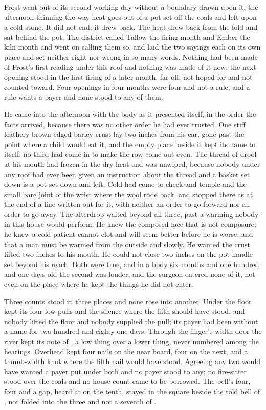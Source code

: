 Frost went out of its second working day without a boundary drawn upon it, the afternoon thinning the way heat goes out of a pot set off the coals and left upon a cold stone. It did not end; it drew back. The heat drew back from the fold and sat behind the pot. The district called Tallow the firing month and Ember the kiln month and went on calling them so, and  laid the two sayings each on its own place and set neither right nor wrong in so many words. Nothing had been made of Frost's first reading under this roof and nothing was made of it now; the next opening stood in the first firing of a later month, far off, not hoped for and not counted toward. Four openings in four months were four and not a rule, and a rule wants a payer and none stood to any of them.

He came into the afternoon with the body as it presented itself, in the order the facts arrived, because there was no other order he had ever trusted. One stiff leathery brown-edged barley crust lay two inches from his ear, gone past the point where a child would eat it, and the empty place beside it kept its name to itself; no third had come in to make the row come out even. The thread of drool at his mouth had frozen in the dry heat and was unwiped, because nobody under any roof had ever been given an instruction about the thread and a basket set down is a pot set down and left. Cold had come to cheek and temple and the small bare joint of the wrist where the wool rode back, and stopped there as at the end of a line written out for it, with neither an order to go forward nor an order to go away. The afterdrop waited beyond all three, past a warming nobody in this house would perform. He knew the composed face that is not composure; he knew a cold patient cannot clot and will seem better before he is worse, and that a man must be warmed from the outside and slowly. He wanted the crust lifted two inches to his mouth. He could not close two inches on the pot handle set beyond his reach. Both were true, and in a body six months and one hundred and one days old the second was louder, and the surgeon entered none of it, not even on the place where he kept the things he did not enter.

Three counts stood in three places and none rose into another. Under the floor  kept its four low pulls and the silence where the fifth should have stood, and nobody lifted the floor and nobody supplied the pull; its payer had been without a name for two hundred and eighty-one days. Through the finger's-width door the river kept its note of , a low thing over a lower thing, never numbered among the hearings. Overhead  kept four nails on the near board, four on the next, and a thumb-width knot where the fifth nail would have stood. Agreeing any two would have wanted a payer put under both and no payer stood to any; no fire-sitter stood over the coals and no house count came to be borrowed. The bell's four, four and a gap, heard at  on the tenth, stayed in the square beside the told bell of , not folded into the three and not a seventh of .

